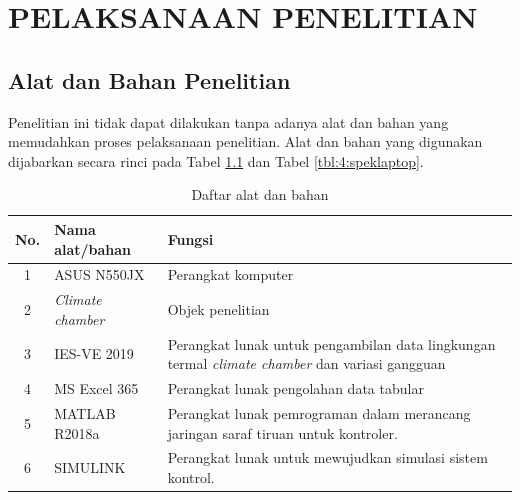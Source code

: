 \chapter{PELAKSANAAN PENELITIAN}
\label{pelaksanaan-penelitian}

\section{Alat dan Bahan Penelitian}
Penelitian ini tidak dapat dilakukan tanpa adanya alat dan bahan yang memudahkan proses pelaksanaan penelitian. Alat dan bahan yang digunakan dijabarkan secara rinci pada Tabel \ref{tbl:4:alatbahan} dan Tabel \ref{tbl:4:speklaptop}.

\vspace{2em}
\begin{table}[!h]
	\caption{Daftar alat dan bahan}
	\label{tbl:4:alatbahan}
	\centering
	\begin{tabular}{|c|p{3.6cm}|p{9cm}|}
		\hline
		No. & Nama alat/bahan & Fungsi \\
		\hline
		1 & ASUS N550JX & Perangkat komputer \\ \hline
		2 & \textit{Climate chamber} & Objek penelitian \\ \hline
		3 & IES-VE 2019 & Perangkat lunak untuk pengambilan data lingkungan termal \textit{climate chamber} dan variasi gangguan \\ \hline
		4 & MS Excel 365 & Perangkat lunak pengolahan data tabular \\ \hline
		5 & MATLAB R2018a & Perangkat lunak pemrograman dalam merancang jaringan saraf tiruan untuk kontroler. \\ \hline
		6 & SIMULINK & Perangkat lunak untuk mewujudkan simulasi sistem kontrol. \\ \hline
	\end{tabular}
\end{table}

